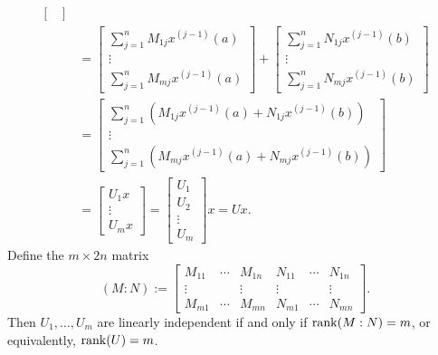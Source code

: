 \documentclass[11pt, oneside, a4paper]{article}
\begin{document}
\begin{rmk}
{\begin{align*}
\begin{bmatrix}
            \end{bmatrix}\\
            &= \begin{bmatrix}
                \sum_{j=1}^n M_{1j}x^{(j-1)}(a)\\
                \vdots\\
                \sum_{j=1}^n M_{mj}x^{(j-1)}(a)
            \end{bmatrix} + \begin{bmatrix}
                \sum_{j=1}^n N_{1j}x^{(j-1)}(b)\\
                \vdots\\
                \sum_{j=1}^n N_{mj}x^{(j-1)}(b)
            \end{bmatrix}\\
            &= \begin{bmatrix}
                \sum_{j=1}^n (M_{1j}x^{(j-1)}(a) + N_{1j}x^{(j-1)}(b))\\
                \vdots\\
                \sum_{j=1}^n (M_{mj}x^{(j-1)}(a) + N_{mj}x^{(j-1)}(b))
            \end{bmatrix}\\
            &= \begin{bmatrix}
                U_1 x\\
                \vdots\\
                U_m x
            \end{bmatrix} = \begin{bmatrix}U_1\\ U_2\\ \vdots \\ U_m
            \end{bmatrix}x = Ux.
    \end{align*}
    }
    Define the $m\times 2n$ matrix
    \[(M:N):=\begin{bmatrix}
        M_{11} & \cdots & M_{1n} & N_{11} & \cdots & N_{1n}\\
        \vdots &  & \vdots & \vdots & & \vdots\\
        M_{m1} & \cdots & M_{mn} & N_{m1} & \cdots & N_{mn}
    \end{bmatrix}.\]
    Then $U_1,\ldots,U_m$ are linearly independent if and only if $\operatorname{rank}(M:N)=m$, or equivalently, $\operatorname{rank}(U)=m$. 
\end{rmk}
\end{document}
